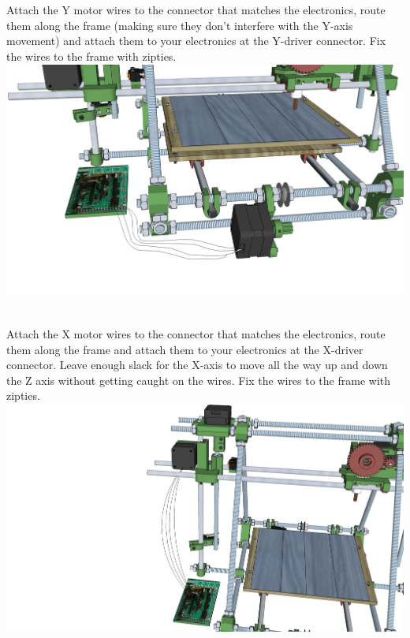 \documentclass[twoside,a4paper,titlepage]{memoir}
\begin{document}
	\section{}
	Attach the Y motor wires to the connector that matches the electronics, route them along the frame
	(making sure they don't interfere with the Y-axis movement) and attach them to your electronics at the
	Y-driver connector. Fix the wires to the frame with zipties.\\
	\includegraphics[width=1\linewidth]{graphics/ch10_14.png}
	
	\section{}
	Attach the X motor wires to the connector that matches the electronics, route them along the frame and
	attach them to your electronics at the X-driver connector. Leave enough slack for the X-axis to move all
	the way up and down the Z axis without getting caught on the wires. Fix the wires to the frame with
	zipties.\\
	\includegraphics[width=1\linewidth]{graphics/ch10_15.png}
	
\end{document}
